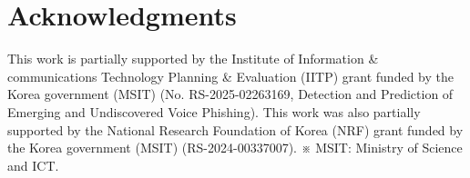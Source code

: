 \section*{Acknowledgments}
\label{sec:acknowledgments}

This work is partially supported by the Institute of Information \& communications Technology Planning \& Evaluation (IITP) grant funded by the Korea government (MSIT) (No. RS-2025-02263169, Detection and Prediction of Emerging and Undiscovered Voice Phishing). This work was also partially supported by the National Research Foundation of Korea (NRF) grant funded by the Korea government (MSIT) (RS-2024-00337007). ※ MSIT: Ministry of Science and ICT.
